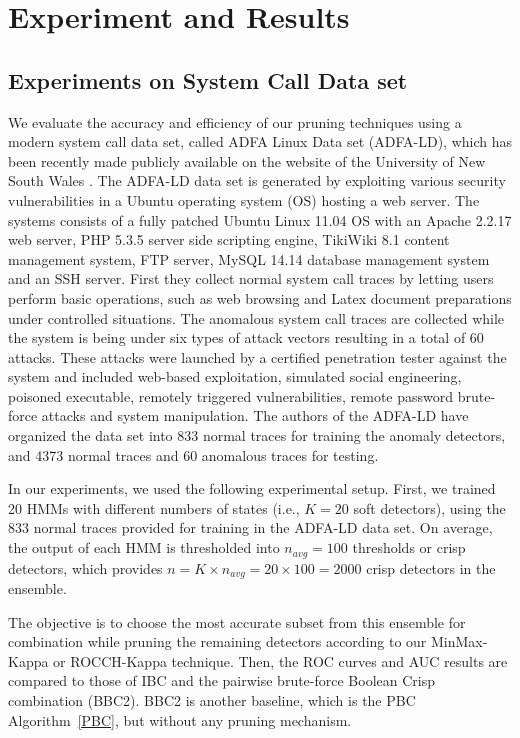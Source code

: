 \chapter{Experiment and Results} \label{chapter4}

\section{Experiments on System Call Data set}
\label{sec:experiments}

We evaluate the accuracy and efficiency of our pruning techniques using a modern system call data set, called ADFA Linux Data set (ADFA-LD), which has been recently made publicly available on the website of the University of New South Wales \cite{Creech2013a}.
The ADFA-LD data set is generated by exploiting various security vulnerabilities in a Ubuntu operating system (OS) hosting a web server.
The systems consists of a fully patched Ubuntu Linux 11.04 OS with an Apache 2.2.17 web server, PHP 5.3.5 server side scripting engine, TikiWiki 8.1 content management system, FTP server, MySQL 14.14 database management system and an SSH server.
First they collect normal system call traces by letting users perform basic operations, such as web browsing and Latex document preparations under controlled situations.
The anomalous system call traces are collected while the system is being under six types of attack vectors resulting in a total of 60 attacks.
These attacks were launched by a certified penetration tester against the system and included web-based exploitation, simulated social engineering, poisoned executable, remotely triggered vulnerabilities, remote password brute-force attacks and system manipulation.
The authors of the ADFA-LD have organized the data set into 833 normal traces for training the anomaly detectors, and 4373 normal traces and 60 anomalous traces for testing.

In our experiments, we used the following experimental setup.
First, we trained 20 HMMs with different numbers of states (i.e., $K=20$ soft detectors), using the 833 normal traces provided for training in the ADFA-LD data set.
On average, the output of each HMM is thresholded into $n_{avg} = 100$ thresholds or crisp detectors, which provides $n = K \times n_{avg} = 20\times 100 =2000$ crisp detectors in the ensemble.

The objective is to choose the most accurate subset from this ensemble for combination while pruning the remaining detectors according to our MinMax-Kappa or ROCCH-Kappa technique.
Then, the ROC curves and AUC results are compared to those of IBC and the pairwise brute-force Boolean Crisp combination (BBC2).
BBC2 is another baseline, which is the PBC Algorithm~\ref{PBC}, but without any pruning mechanism.

